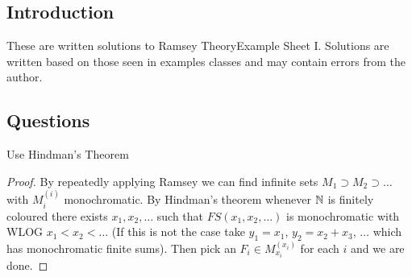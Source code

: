 \documentclass[a4paper]{article}
\def\ntitle{Ramsey Theory}
\def\nsheet{I}
\newcommand{\Nomega}{\N^{(\omega)}}
\begin{document}
	
	
	\subsection*{Introduction}
	These are written solutions to \ntitle  Example Sheet \nsheet. Solutions are written based on those seen in examples classes and may contain errors from the author.
	\subsection*{Questions}
  \begin{idea}
    Use Hindman's Theorem
  \end{idea}
  \begin{proof}
    By repeatedly applying Ramsey we can find infinite
    sets $M_1 \supset M_2 \supset \dots$ with $M_i^{(i)}$ monochromatic.
    By Hindman's theorem whenever $\N$ is finitely coloured there exists $x_1, x_2, \dots$ such that $FS(x_1, x_2,
    \dots)$ is monochromatic with WLOG $x_1 < x_2 < \dots$ (If this is not
    the case take $y_1 = x_1$, $y_2 = x_2 + x_3$, $\dots$ which has
    monochromatic finite sums). Then pick an $F_i \in M_{x_i}^{(x_i)}$ for each
    $i$ and we are done.
    \end{proof}
  
\end{document}
